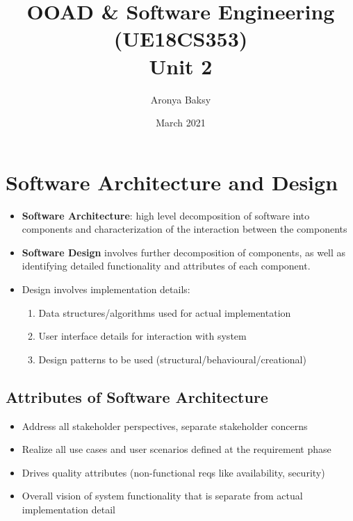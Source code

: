 \documentclass{article}
\title{OOAD \& Software Engineering (UE18CS353) \\
    Unit 2}
\author{Aronya Baksy}
\date{March 2021}
\begin{document}
\maketitle
\section{Software Architecture and Design}
\begin{itemize}
    \item \textbf{Software Architecture}: high level decomposition of software into components and characterization of the interaction between the components
    
    \item \textbf{Software Design} involves further decomposition of components, as well as identifying detailed functionality and attributes of each component.
    
    \item Design involves implementation details:
    \begin{enumerate}
        \item Data structures/algorithms used for actual implementation
        
        \item User interface details for interaction with system
        
        \item Design patterns to be used (structural/behavioural/creational)
    \end{enumerate}
\end{itemize}
\subsection{Attributes of Software Architecture}
\begin{itemize}
    \item Address all stakeholder perspectives, separate stakeholder concerns
    
    \item Realize all use cases and user scenarios defined at the requirement phase
    
    \item Drives quality attributes (non-functional reqs like availability, security)
    
    \item Overall vision of system functionality that is separate from actual implementation detail
\end{itemize}
\end{document}
